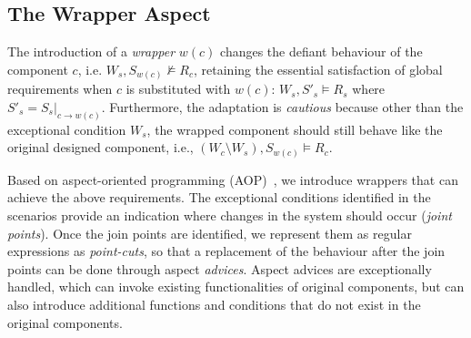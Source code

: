\subsection{The Wrapper Aspect}
The introduction of a {\it wrapper} $w(c)$ changes the defiant behaviour of the component $c$, i.e. $W_s, S_{w(c)} \not \models R_c$, retaining the essential satisfaction of global requirements when $c$ is substituted with $w(c)$:  $W_s, S'_s \models R_s$ where $S'_s = S_s |_{c \rightarrow w(c)}$. Furthermore, the adaptation is {\it cautious} because other than the exceptional condition $W_s$, the wrapped component should still behave like the original designed component, i.e., $(W_c \setminus W_s), S_{w(c)} \models R_c$. 

Based on aspect-oriented programming (AOP)~\cite{Kiczales:2001}, we introduce wrappers that can achieve the above requirements. The exceptional conditions identified in the scenarios provide an indication where changes in the system should occur ({\it joint points}). Once the join points are identified, we represent them as regular expressions as {\it point-cuts}, so that a replacement of the behaviour after the join points can be done through aspect {\it advices}. Aspect advices are exceptionally handled, which can invoke existing functionalities of original components, but can also introduce additional functions and conditions that do not exist in the original components.




